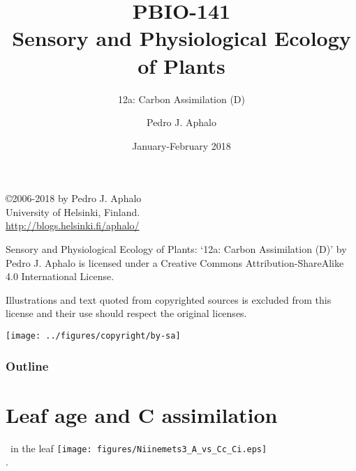 \documentclass[10pt]{beamer}
\begin{document}
\title{PBIO-141\\Sensory and Physiological Ecology of  Plants}
\subtitle{12a: Carbon Assimilation (D)}
\author{Pedro J. Aphalo}
\date{January-February 2018}

  \begin{frame}
    \maketitle
  \end{frame}

  \begin{frame}[c]
    \begin{center}
      \begin{small}
        \copyright 2006-2018 by Pedro J. Aphalo\\
       University of Helsinki, Finland.\\
        \textcolor{blue}{\url{http://blogs.helsinki.fi/aphalo/}}\\[2ex]
      \end{small}

      \begin{footnotesize}
        Sensory and Physiological Ecology of  Plants: `12a: Carbon Assimilation (D)' by Pedro J. Aphalo is licensed under a Creative Commons Attribution-ShareAlike 4.0 International License.

        Illustrations and text quoted from copyrighted sources is excluded from this license and their use should respect the original licenses.\\[2ex]
      \end{footnotesize}

      \centering\texttt{[image: ../figures/copyright/by-sa]}
    \end{center}
  \end{frame}

  \begin{frame}
    \frametitle{Outline}
    \tableofcontents
  \end{frame}

\section{Leaf age and C assimilation}

\begin{frame}{\COtwo\ in the leaf}
    \centering
    \texttt{[image: figures/Niinemets3\_A\_vs\_Cc\_Ci.eps]}\\
    {\small \autocite[from][]{Niinemets2005b}.}
\end{frame}
\end{document}
